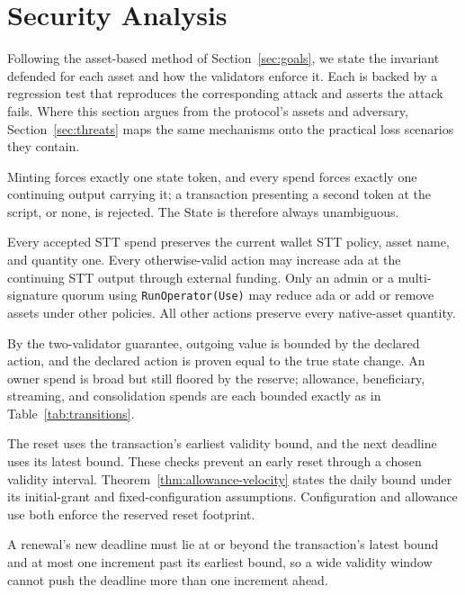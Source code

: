 \documentclass[11pt,DIV=11,parskip=half-]{scrartcl}
\begin{document}
\section{Security Analysis}
\label{sec:security}

Following the asset-based method of Section~\ref{sec:goals}, we state the invariant defended for each asset and how the validators enforce it. Each is backed by a regression test that reproduces the corresponding attack and asserts the attack fails. Where this section argues from the protocol's assets and adversary, Section~\ref{sec:threats} maps the same mechanisms onto the practical loss scenarios they contain.

\begin{description}[leftmargin=1.4em,style=nextline]
\item[Single state thread.] Minting forces exactly one state token, and every spend forces exactly one continuing output carrying it; a transaction presenting a second token at the script, or none, is rejected. The State is therefore always unambiguous.
\item[STT-output value permissions.] Every accepted STT spend preserves the current wallet STT policy, asset name, and quantity one. Every otherwise-valid action may increase ada at the continuing STT output through external funding. Only an admin or a multi-signature quorum using \texttt{RunOperator(Use)} may reduce ada or add or remove assets under other policies. All other actions preserve every native-asset quantity.
\item[Bounded movement.] By the two-validator guarantee, outgoing value is bounded by the declared action, and the declared action is proven equal to the true state change. An owner spend is broad but still floored by the reserve; allowance, beneficiary, streaming, and consolidation spends are each bounded exactly as in Table~\ref{tab:transitions}.
\item[Allowance velocity.] The reset uses the transaction's earliest validity bound, and the next deadline uses its latest bound.
These checks prevent an early reset through a chosen validity interval.
Theorem~\ref{thm:allowance-velocity} states the daily bound under its initial-grant and fixed-configuration assumptions.
Configuration and allowance use both enforce the reserved reset footprint.
\item[Proof-of-life ceiling.] A renewal's new deadline must lie at or beyond the transaction's latest bound and at most one increment past its earliest bound, so a wide validity window cannot push the deadline more than one increment ahead.

\end{description}
\end{document}
